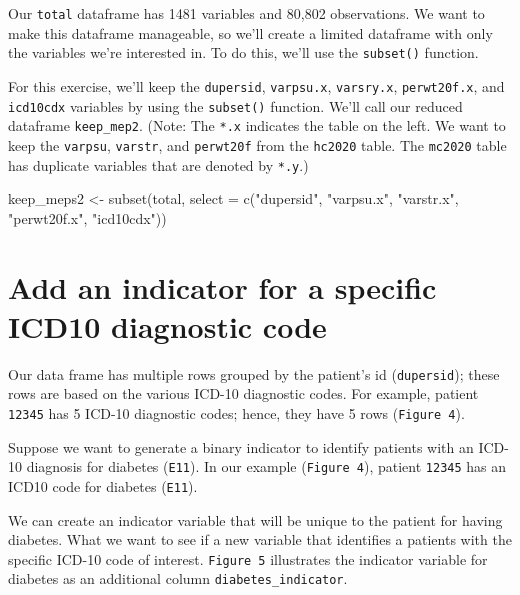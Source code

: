 \documentclass[
]{book}
\newenvironment{Shaded}{\begin{snugshade}}{\end{snugshade}}
\newcommand{\AttributeTok}[1]{\textcolor[rgb]{0.77,0.63,0.00}{#1}}
\newcommand{\FunctionTok}[1]{\textcolor[rgb]{0.00,0.00,0.00}{#1}}
\newcommand{\NormalTok}[1]{#1}
\newcommand{\OtherTok}[1]{\textcolor[rgb]{0.56,0.35,0.01}{#1}}
\newcommand{\StringTok}[1]{\textcolor[rgb]{0.31,0.60,0.02}{#1}}
\theoremstyle{definition}
\theoremstyle{definition}
\theoremstyle{definition}
\theoremstyle{definition}
\theoremstyle{remark}
\begin{document}
Our \texttt{total} dataframe has 1481 variables and 80,802 observations. We want to make this dataframe manageable, so we'll create a limited dataframe with only the variables we're interested in. To do this, we'll use the \texttt{subset()} function.

For this exercise, we'll keep the \texttt{dupersid}, \texttt{varpsu.x}, \texttt{varsry.x}, \texttt{perwt20f.x}, and \texttt{icd10cdx} variables by using the \texttt{subset()} function. We'll call our reduced dataframe \texttt{keep\_mep2}. (Note: The \texttt{*.x} indicates the table on the left. We want to keep the \texttt{varpsu}, \texttt{varstr}, and \texttt{perwt20f} from the \texttt{hc2020} table. The \texttt{mc2020} table has duplicate variables that are denoted by \texttt{*.y}.)

\begin{Shaded}
\begin{Highlighting}[]
\NormalTok{keep\_meps2 }\OtherTok{\textless{}{-}} \FunctionTok{subset}\NormalTok{(total, }\AttributeTok{select =} \FunctionTok{c}\NormalTok{(}\StringTok{"dupersid"}\NormalTok{, }\StringTok{"varpsu.x"}\NormalTok{, }\StringTok{"varstr.x"}\NormalTok{, }\StringTok{"perwt20f.x"}\NormalTok{, }\StringTok{"icd10cdx"}\NormalTok{))}
\end{Highlighting}
\end{Shaded}

\hypertarget{add-an-indicator-for-a-specific-icd10-diagnostic-code}{%
\section{Add an indicator for a specific ICD10 diagnostic code}\label{add-an-indicator-for-a-specific-icd10-diagnostic-code}}

Our data frame has multiple rows grouped by the patient's id (\texttt{dupersid}); these rows are based on the various ICD-10 diagnostic codes. For example, patient \texttt{12345} has 5 ICD-10 diagnostic codes; hence, they have 5 rows (\texttt{Figure\ 4}).

Suppose we want to generate a binary indicator to identify patients with an ICD-10 diagnosis for diabetes (\texttt{E11}). In our example (\texttt{Figure\ 4}), patient \texttt{12345} has an ICD10 code for diabetes (\texttt{E11}).

We can create an indicator variable that will be unique to the patient for having diabetes. What we want to see if a new variable that identifies a patients with the specific ICD-10 code of interest. \texttt{Figure\ 5} illustrates the indicator variable for diabetes as an additional column \texttt{diabetes\_indicator}.
\end{document}
